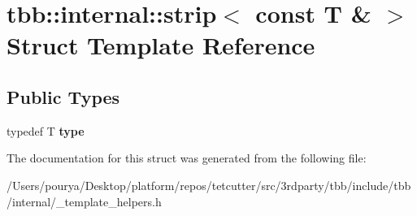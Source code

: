 \hypertarget{structtbb_1_1internal_1_1strip_3_01const_01T_01_6_01_4}{}\section{tbb\+:\+:internal\+:\+:strip$<$ const T \& $>$ Struct Template Reference}
\label{structtbb_1_1internal_1_1strip_3_01const_01T_01_6_01_4}
\subsection*{Public Types}
\begin{DoxyCompactItemize}
\item 
\hypertarget{structtbb_1_1internal_1_1strip_3_01const_01T_01_6_01_4_a34de3326ea828053b4ce1de9db0cc4ed}{}typedef T {\bfseries type}\label{structtbb_1_1internal_1_1strip_3_01const_01T_01_6_01_4_a34de3326ea828053b4ce1de9db0cc4ed}

\end{DoxyCompactItemize}


The documentation for this struct was generated from the following file\+:\begin{DoxyCompactItemize}
\item 
/\+Users/pourya/\+Desktop/platform/repos/tetcutter/src/3rdparty/tbb/include/tbb/internal/\+\_\+template\+\_\+helpers.\+h\end{DoxyCompactItemize}
